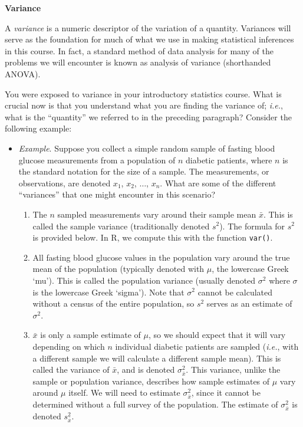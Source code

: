 \documentclass[
]{book}
\providecommand{\tightlist}{%
  \setlength{\itemsep}{0pt}\setlength{\parskip}{0pt}}
\begin{document}
\textbf{Variance}

A \emph{variance} is a numeric descriptor of the variation of a quantity.
Variances will serve as the foundation for much of what we use in making statistical inferences in this course.
In fact, a standard method of data analysis for many of the problems we will encounter is known as analysis of variance (shorthanded ANOVA).

You were exposed to variance in your introductory statistics course.
What is crucial now is that you understand what you are finding the variance of; \emph{i.e.}, what is the ``quantity'' we referred to in the preceding paragraph?
Consider the following example:

\begin{itemize}
\item
  \emph{Example}. Suppose you collect a simple random sample of fasting blood glucose measurements from a population of \(n\) diabetic patients, where \(n\) is the standard notation for the size of a sample. The measurements, or observations, are denoted \(x_1\), \(x_2\), \(\ldots\), \(x_n\). What are some of the different ``variances'' that one might encounter in this scenario?

  \begin{enumerate}
  \def\labelenumi{\arabic{enumi}.}
  \tightlist
  \item
    The \(n\) sampled measurements vary around their sample mean \(\bar{x}\). This is called the sample variance (traditionally denoted \(s^2\)). The formula for \(s^2\) is provided below. In R, we compute this with the function \texttt{var()}.
  \item
    All fasting blood glucose values in the population vary around the true mean of the population (typically denoted with \(\mu\), the lowercase Greek `mu'). This is called the population variance (usually denoted \(\sigma^2\) where \(\sigma\) is the lowercase Greek `sigma'). Note that \(\sigma^2\) cannot be calculated without a census of the entire population, so \(s^2\) serves as an estimate of \(\sigma^2\).
  \item
    \(\bar{x}\) is only a sample estimate of \(\mu\), so we should expect that it will vary depending on which \(n\) individual diabetic patients are sampled (\emph{i.e.}, with a different sample we will calculate a different sample mean). This is called the variance of \(\bar{x}\), and is denoted \(\sigma_{\bar{x}}^2\). This variance, unlike the sample or population variance, describes how sample estimates of \(\mu\) vary around \(\mu\) itself. We will need to estimate \(\sigma_{\bar{x}}^2\), since it cannot be determined without a full survey of the population. The estimate of \(\sigma_{\bar{x}}^2\) is denoted \(s_{\bar{x}}^2\).
  \end{enumerate}
\end{itemize}
\end{document}
